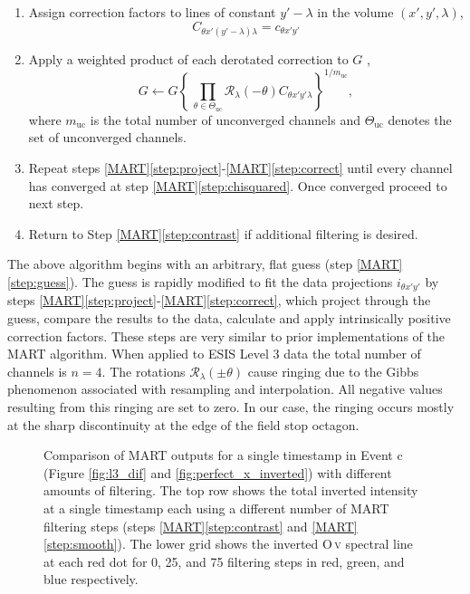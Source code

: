\begin{enumerate}
	\item Assign correction factors to lines of constant $y'-\lambda$ in the volume $(x',y',\lambda)$,
	\begin{equation}
	C_{\theta x'(y'-\lambda)\lambda} = c_{\theta x'y'}
	\end{equation}	
	\item \label{step:correct} Apply a weighted product of each derotated correction to $G$ ,
	\begin{equation}\label{eq:correct}
	G \leftarrow G\left\lbrace  \,\prod_{\theta\in\Theta_{\mathrm{uc}}}  \mathcal{R}_\lambda(-\theta)C_{\theta x'y'\lambda} \right\rbrace^{1/m_{\mathrm{uc}}},
	\end{equation}
	where $m_{\mathrm{uc}}$ is the total number of unconverged channels and $\Theta_{\mathrm{uc}}$ denotes the set of unconverged channels.
	
	\item Repeat steps \ref{MART}\ref{step:project}-\ref{MART}\ref{step:correct}
	until every channel has converged at step \ref{MART}\ref{step:chisquared}. Once converged proceed to next step.
	\item Return to Step \ref{MART}\ref{step:contrast} if additional filtering is desired.
\end{enumerate}
The above algorithm begins with an arbitrary, flat guess (step \ref{MART}\ref{step:guess}). The guess is rapidly modified to fit the data projections $i_{\theta x' y'}$ by steps \ref{MART}\ref{step:project}-\ref{MART}\ref{step:correct}, which project through the guess, compare the results to the data, calculate and apply intrinsically positive correction factors. These steps are very similar to prior implementations of the MART algorithm.
When applied to  ESIS Level 3 data the total number of channels is $n = 4$. 
The rotations $\mathcal{R}_{\lambda}(\pm{\theta})$ cause ringing due to the Gibbs phenomenon associated with resampling and interpolation. 
All negative values resulting from this ringing are set to zero.
In our case, the ringing occurs mostly at the sharp discontinuity at the edge of the field stop octagon. 

\begin{figure}[htb!]
	\center
	\caption{Comparison of MART outputs for a single timestamp in Event c (Figure \ref{fig:l3_dif} and \ref{fig:perfect_x_inverted}) with different amounts of filtering. 
		The top row shows the total inverted intensity at a single timestamp each using a different number of MART filtering steps (steps \ref{MART}\ref{step:contrast} and \ref{MART}\ref{step:smooth}).  
		The lower grid shows the inverted O\,\textsc{v} spectral line at each red dot for 0, 25, and 75 filtering steps in red, green, and blue respectively.}
	\label{fig:perfect_x_invertcomp}
\end{figure}


